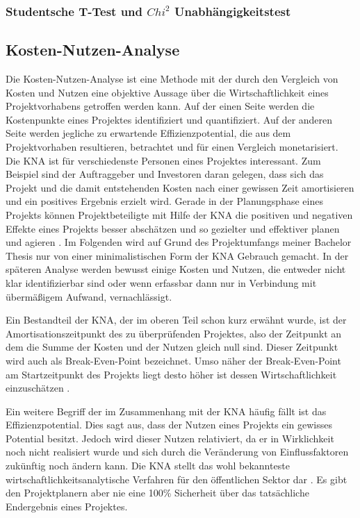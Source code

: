 \subsubsection{Studentsche T-Test und $Chi^2$ Unabhängigkeitstest}

\subsection{Kosten-Nutzen-Analyse}
Die Kosten-Nutzen-Analyse ist eine Methode mit der durch den Vergleich von Kosten und Nutzen eine objektive Aussage über die Wirtschaftlichkeit eines Projektvorhabens getroffen werden kann. Auf der einen Seite werden die Kostenpunkte eines Projektes identifiziert und quantifiziert. Auf der anderen Seite werden jegliche zu erwartende Effizienzpotential, die aus dem Projektvorhaben resultieren, betrachtet und für einen Vergleich monetarisiert. Die \gls{KNA} ist für verschiedenste Personen eines Projektes interessant. Zum Beispiel sind der Auftraggeber und Investoren daran gelegen, dass sich das Projekt und die damit entstehenden Kosten nach einer gewissen Zeit amortisieren und ein positives Ergebnis erzielt wird. Gerade in der Planungsphase eines Projekts können Projektbeteiligte mit Hilfe der \gls{KNA} die positiven und negativen Effekte eines Projekts besser abschätzen und so gezielter und effektiver planen und agieren \citep{Hanusch2011}. Im Folgenden wird auf Grund des Projektumfangs meiner Bachelor Thesis nur von einer minimalistischen Form der \gls{KNA} Gebrauch gemacht. In der späteren Analyse werden bewusst einige Kosten und Nutzen, die entweder nicht klar identifizierbar sind oder wenn erfassbar dann nur in Verbindung mit übermäßigem Aufwand, vernachlässigt. 

Ein Bestandteil der \gls{KNA}, der im oberen Teil schon kurz erwähnt wurde, ist der Amortisationszeitpunkt des zu überprüfenden Projektes, also der Zeitpunkt an dem die Summe der Kosten und der Nutzen gleich null sind. Dieser Zeitpunkt wird auch als Break-Even-Point bezeichnet. Umso näher der Break-Even-Point am Startzeitpunkt des Projekts liegt desto höher ist dessen Wirtschaftlichkeit einzuschätzen \citep{Hanusch2011}.

Ein weitere Begriff der im Zusammenhang mit der \gls{KNA} häufig fällt ist das Effizienzpotential. Dies sagt aus, dass der Nutzen eines Projekts ein gewisses Potential besitzt. Jedoch wird dieser Nutzen relativiert, da er in Wirklichkeit noch nicht realisiert wurde und sich durch die Veränderung von Einflussfaktoren zukünftig noch ändern kann. Die \gls{KNA} \glqq [...] stellt das wohl bekannteste wirtschaftlichkeitsanalytische Verfahren für den öffentlichen Sektor dar\grqq{} \citep[1]{Hanusch2011}. Es gibt den Projektplanern aber nie eine 100\% Sicherheit über das tatsächliche Endergebnis eines Projektes.

